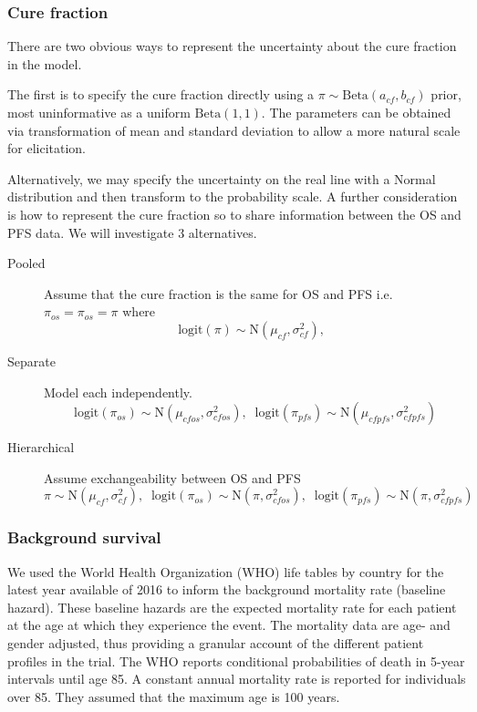 \documentclass[AMA,STIX1COL]{WileyNJD-v2}
\begin{document}
\subsubsection{Cure fraction}
There are two obvious ways to represent the uncertainty about the cure
fraction in the model.

The first is to specify the cure fraction directly using a
$\pi \sim \text{Beta}(a_{cf}, b_{cf})$ prior, most uninformative as a uniform
$\text{Beta}(1,1)$. The parameters can be obtained via transformation of mean
and standard deviation to allow a more natural scale for elicitation.

Alternatively, we may specify the uncertainty on the real line with a
Normal distribution and then transform to the probability scale.
A further consideration is how to represent the cure fraction so to
share information between the OS and PFS data. We will investigate 3
alternatives.

\begin{description}
    \item[Pooled] Assume that the cure fraction is the same for OS and PFS
    i.e. $\pi_{os} = \pi_{os} = \pi$ where $$
    \text{logit}(\pi) \sim \text{N}(\mu_{cf}, \sigma_{cf}^2), \;\;
    $$
    \item[Separate] Model each independently. $$
    \text{logit}(\pi_{os}) \sim \text{N}(\mu_{cfos}, \sigma_{cfos}^2), \;\;  
    \text{logit}(\pi_{pfs}) \sim \text{N}(\mu_{cfpfs}, \sigma_{cfpfs}^2)  
    $$
    \item[Hierarchical] Assume exchangeability between OS and PFS$$
    \pi \sim \text{N}(\mu_{cf}, \sigma_{cf}^2), \;\;  
    \text{logit}(\pi_{os}) \sim \text{N}(\pi, \sigma_{cfos}^2), \;\;  
    \text{logit}(\pi_{pfs}) \sim \text{N}(\pi, \sigma_{cfpfs}^2)  
    $$
\end{description}

\subsubsection{Background survival}
We used the World Health Organization
(WHO) life tables by country for the latest year available of 2016
\cite{wholifetables} to inform the background mortality rate (baseline
hazard). These baseline hazards are the expected mortality rate for each
patient at the age at which they experience the event. The mortality
data are age- and gender adjusted, thus providing a granular account of
the different patient profiles in the trial. The WHO reports conditional
probabilities of death in 5-year intervals until age 85. A constant
annual mortality rate is reported for individuals over 85. They assumed
that the maximum age is 100 years.
\end{document}
